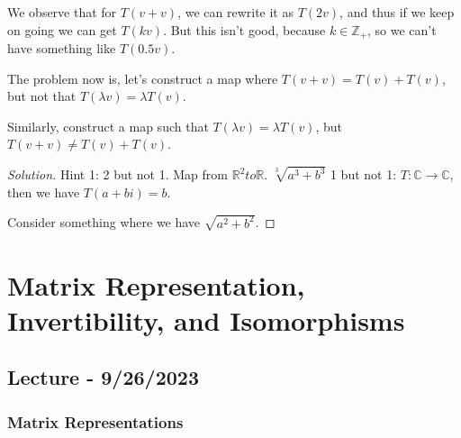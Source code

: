 \documentclass[openany]{book}
\newenvironment{solution}{\begin{proof}[Solution]}{\end{proof}}
\newcommand{\CC}{\mathbb{C}}
\newcommand{\RR}{\mathbb{R}}
\newcommand{\ZZ}{\mathbb{Z}}
\begin{document}
\begin{hw}
	We observe that for $T(v+v)$, we can rewrite it as $T(2v)$, and thus if we keep on going we can get $T(kv)$. But this isn't good, because $k \in \ZZ_{+}$, so we can't have something like $T(0.5v)$.
	
	The problem now is, let's construct a map where $T(v+v) = T(v) + T(v)$, but not that $T(\lambda v) = \lambda T(v)$.
	
	Similarly, construct a map such that $T(\lambda v) = \lambda T(v)$, but $T(v+v) \not= T(v) + T(v)$.
\end{hw}
\begin{solution}
	Hint 1: 2 but not 1. Map from $\RR^{2} to \RR$. $\sqrt[3]{a^{3} + b^{3}}$
	1 but not 1: $T: \CC \rightarrow \CC$, then we have $T(a+bi) = b$.
	
	Consider something where we have $\sqrt{a^{2} + b^{2}}$.  
\end{solution}
	
	
\chapter{Matrix Representation, Invertibility, and Isomorphisms}
\section{Lecture - 9/26/2023}
\subsection{Matrix Representations}
\end{document}
